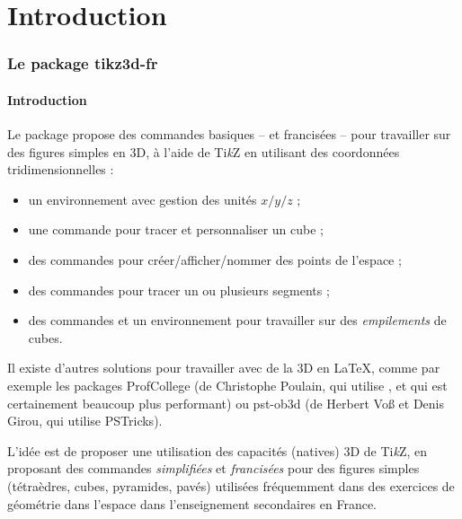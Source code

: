 \documentclass[french,a4paper,11pt]{article}
\providecommand\tikzlogo{Ti\textit{k}Z}
\providecommand\PSTricks{\textsf{PSTricks}\xspace}
\let\pstricks\PSTricks
\let\TikZ\tikzlogo
\begin{document}
\newpage

\part{Introduction}

\section{Le package tikz3d-fr}

\subsection{Introduction}

\begin{noteblock}
Le package propose des commandes basiques -- et francisées -- pour travailler sur des figures simples en 3D, à l'aide de \TikZ{} en utilisant des coordonnées tridimensionnelles :

\begin{itemize}
	\item un environnement avec gestion des unités $x/y/z$ ;
	\item une commande pour tracer et personnaliser un cube ;
	\item des commandes pour créer/afficher/nommer des points de l'espace ;
	\item des commandes pour tracer un ou plusieurs segments ;
	\item des commandes et un environnement pour travailler sur des \textit{empilements} de cubes.
\end{itemize}
\vspace*{-\baselineskip}\leavevmode
\end{noteblock}

\begin{importantblock}
Il existe d'autres solutions pour travailler avec de la 3D en \LaTeX, comme par exemple les packages \textsf{ProfCollege}\footnotemark{} (de Christophe Poulain, qui utilise , et qui est certainement beaucoup plus performant) ou \textsf{pst-ob3d}\footnotemark{} (de Herbert Voß et Denis Girou, qui utilise \pstricks).

\smallskip

L'idée est de proposer une utilisation des capacités (natives) 3D de \TikZ, en proposant des commandes \textit{simplifiées} et \textit{francisées} pour des figures simples (tétraèdres, cubes, pyramides, pavés) utilisées fréquemment dans des exercices de géométrie dans l'espace dans l'enseignement secondaires en France.
\end{importantblock}
\end{document}
